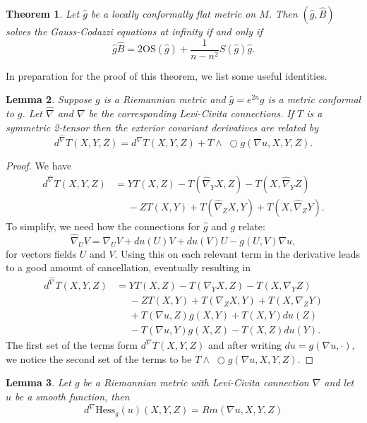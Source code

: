 \documentclass{amsart}
\newcommand{\wtimes}{\wedge \!\!\!\!\!\!\!\!\;\bigcirc}
\newtheorem{thm}{Theorem}[section]
\newtheorem{lem}[thm]{Lemma}
\begin{document}
\begin{thm}
\label{MainThm}
Let $\hat{g}$ be a locally conformally flat metric on $M$. Then $(\hat{g},\hat{B})$ solves the Gauss-Codazzi equations at infinity if and only if 
\[
\hat{g} \hat{B} = 2\mathrm{OS}(\hat{g}) + \frac{1}{n-n^2}S(\hat{g})\hat{g}.
\]
\end{thm}

In preparation for the proof of this theorem, we list some useful identities. 

\begin{lem}
\label{dRel}
Suppose $g$ is a Riemannian metric and $\hat{g} = e^{2u}g$ is a metric conformal to $g$. Let $\hat{\nabla}$ and $\nabla$ be the corresponding Levi-Civita connections. 
If $T$ is a symmetric 2-tensor then the exterior covariant derivatives are related by 
\[
d^{\hat{\nabla}} T(X,Y,Z) = d^\nabla T(X,Y,Z) + T \wtimes g (\nabla u ,X,Y,Z).
\]
\end{lem}
\begin{proof}
We have
\begin{align*}
d^{\hat{\nabla}}T(X,Y,Z)
&= YT(X,Z) - T(\hat{\nabla}_YX,Z) - T(X, \hat{\nabla}_YZ) \\
&\phantom{=} - ZT(X,Y) + T(\hat{\nabla}_ZX,Y) + T(X,\hat{\nabla}_ZY).
\end{align*}
To simplify, we need how the connections for $\hat{g}$ and $g$ relate:
\[
\hat{\nabla}_UV = \nabla_UV + du(U)V + du(V)U - g(U,V)\nabla u,
\]
for vectors fields $U$ and $V$.
Using this on each relevant term in the derivative leads to a good amount of cancellation, eventually resulting in 
\begin{align*}
d^{\hat{\nabla}}T(X,Y,Z)
&=YT(X,Z) - T(\nabla_YX,Z) - T(X, \nabla_YZ) \\
&\phantom{=} - ZT(X,Y) + T(\nabla_ZX,Y) + T(X,\nabla_ZY) \\
&\phantom{=} + T(\nabla u ,Z)g(X,Y) + T(X,Y)du(Z) \\
&\phantom{=} - T(\nabla u, Y)g(X,Z) - T(X,Z)du(Y).
\end{align*}
The first set of the terms form $d^\nabla T(X,Y,Z)$ and after writing $du = g(\nabla u , \cdot)$, we notice the second set of the terms to be $T\wtimes g(\nabla u ,X,Y,Z)$.
\end{proof}

\begin{lem}
\label{Hess}
Let $g$ be a Riemannian metric with Levi-Civita connection $\nabla$ and let $u$ be a smooth function, then
\[
d^\nabla \mathrm{Hess}_g(u) (X,Y,Z) = Rm(\nabla u, X, Y, Z)
\]
\end{lem}
\end{document}
